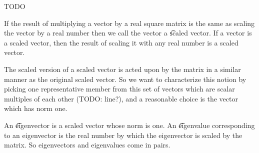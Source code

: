 
\sbasic







































\sstart
{}


TODO


If the result of multiplying a vector by a real square matrix is the same as scaling the vector by a real number then we call the vector a \t{scaled vector}.
If a vector is a scaled vector, then the result of scaling it with any real number is a scaled vector.

The scaled version of a scaled vector is acted upon by the matrix in a similar manner as the original scaled vector.
So we want to characterize this notion by picking one representative member from this set of vectors which are scalar multiples of each other (TODO: line?), and a reasonable choice is the vector which has norm one.

An \t{eigenvector} is a scaled vector whose norm is one.
An \t{eigenvalue} corresponding to an eigenvector is the real number by which the eigenvector is scaled by the matrix.
So eigenvectors and eigenvalues come in pairs.
\strats
